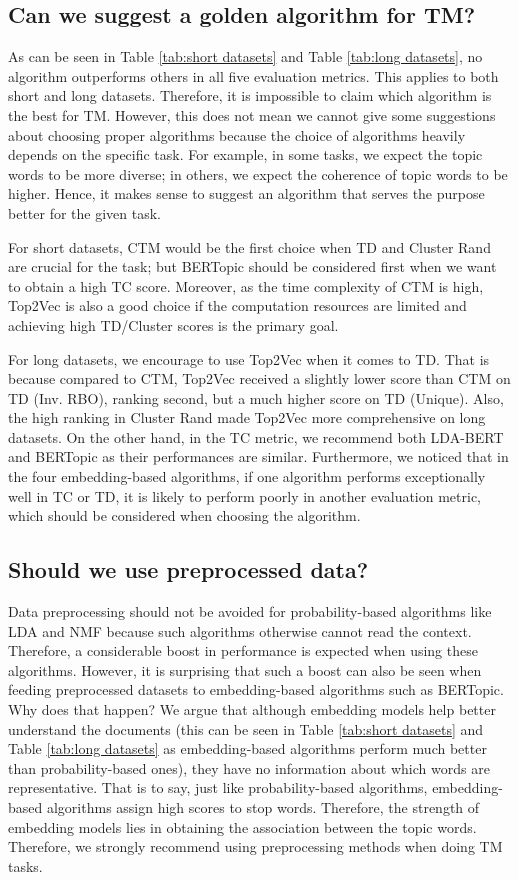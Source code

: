 \documentclass[11pt]{article}
\begin{document}
\subsection{Can we suggest a golden algorithm for TM?}
As can be seen in Table \ref{tab:short datasets} and Table  \ref{tab:long datasets}, no algorithm outperforms others in all five evaluation metrics. This applies to both short and long datasets. Therefore, it is impossible to claim which algorithm is the best for TM. However, this does not mean we cannot give some suggestions about choosing proper algorithms because the choice of algorithms heavily depends on the specific task. For example, in some tasks, we expect the topic words to be more diverse; in others, we expect the coherence of topic words to be higher. Hence, it makes sense to suggest an algorithm that serves the purpose better for the given task.

For short datasets, CTM would be the first choice when TD and Cluster Rand are crucial for the task; but BERTopic should be considered first when we want to obtain a high TC score. Moreover, as the time complexity of CTM is high, Top2Vec is also a good choice if the computation resources are limited and achieving high TD/Cluster scores is the primary goal.

For long datasets, we encourage to use Top2Vec when it comes to TD. That is because compared to CTM, Top2Vec received a slightly lower score than CTM on TD (Inv. RBO), ranking second, but a much higher score on TD (Unique). Also, the high ranking in Cluster Rand made Top2Vec more comprehensive on long datasets. On the other hand, in the TC metric,  we recommend both LDA-BERT and BERTopic as their performances are similar. Furthermore, we noticed that in the four embedding-based algorithms, if one algorithm performs exceptionally well in TC or TD, it is likely to perform poorly in another evaluation metric, which should be considered when choosing the algorithm.

\subsection{Should we use preprocessed data?}
Data preprocessing should not be avoided for probability-based algorithms like LDA and NMF because such algorithms otherwise cannot read the context. Therefore, a considerable boost in performance is expected when using these algorithms. However, it is surprising that such a boost can also be seen when feeding preprocessed datasets to embedding-based algorithms such as BERTopic. Why does that happen? We argue that although embedding models help better understand the documents (this can be seen in Table \ref{tab:short datasets} and Table  \ref{tab:long datasets} as embedding-based algorithms perform much better than probability-based ones), they have no information about which words are representative. That is to say, just like probability-based algorithms, embedding-based algorithms assign high scores to stop words. Therefore, the strength of embedding models lies in obtaining the association between the topic words. Therefore, we strongly recommend using preprocessing methods when doing TM tasks.
\end{document}
